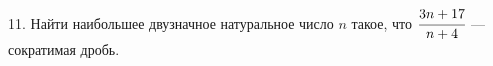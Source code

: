 11. Найти наибольшее двузначное натуральное число $n$ такое, что $\cfrac{3n+17}{n+4}$ --- сократимая дробь.\\
